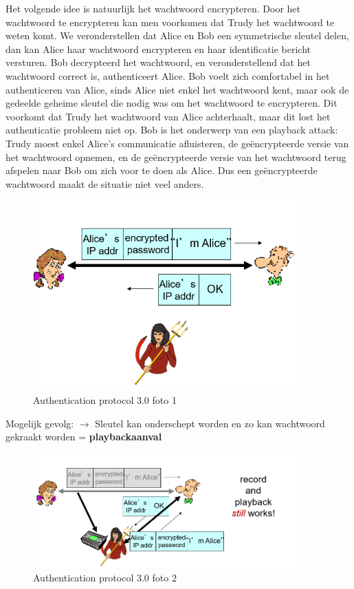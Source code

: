 Het volgende idee is natuurlijk het wachtwoord encrypteren. Door het wachtwoord te encrypteren kan men voorkomen dat Trudy het wachtwoord te weten komt. We veronderstellen dat Alice en Bob een symmetrische sleutel delen, dan kan Alice haar wachtwoord encrypteren en haar identificatie bericht versturen. Bob decrypteerd het wachtwoord, en veronderstellend dat het wachtwoord correct is, authenticeert Alice. Bob voelt zich comfortabel in het authenticeren van Alice, sinds Alice niet enkel het wachtwoord kent, maar ook de gedeelde geheime sleutel die nodig was om het wachtwoord te encrypteren.
Dit voorkomt dat Trudy het wachtwoord van Alice achterhaalt, maar dit lost het authenticatie probleem niet op. Bob is het onderwerp van een playback attack: Trudy moest enkel Alice’s communicatie afluisteren, de geëncrypteerde versie van het wachtwoord opnemen, en de geëncrypteerde versie van het wachtwoord terug afspelen naar Bob om zich voor te doen als Alice. Dus een geëncrypteerde wachtwoord maakt de situatie niet veel anders.

\begin{figure}[h]
    \centering
    \includegraphics[width=4in]{./img/imghfdst8/hfdst8puntje18.png}
    \caption{Authentication protocol 3.0 foto 1 }      
    \label{fig:Authentication protocol 3.0 foto 1 }
\end{figure}

\noindent Mogelijk gevolg: $\rightarrow$ Sleutel kan onderschept worden en zo kan wachtwoord gekraakt worden = \textbf{playbackaanval}

\begin{figure}[h]
    \centering
    \includegraphics[width=4in]{./img/imghfdst8/hfdst8puntje19.png}
    \caption{Authentication protocol 3.0 foto 2 }      
    \label{fig:Authentication protocol 3.0 foto 2}
\end{figure}

